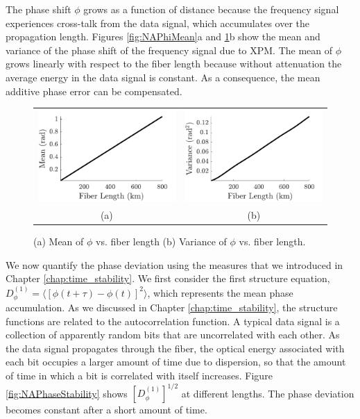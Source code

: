 The phase shift $\phi$ grows as a function of distance because the frequency signal experiences cross-talk from the data signal, which accumulates over the propagation length. Figures \ref{fig:NAPhiMean}a and \ref{fig:NAPhiVar}b show the mean and variance of the phase shift of the frequency signal due to XPM. The mean of $\phi$ grows linearly with respect to the fiber length because without attenuation the average energy in the data signal is constant. As a consequence, the mean additive phase error can be compensated.
%
\begin{figure}[htb]
	\raggedright
	\begin{tabular}{c c}
		\includegraphics[width=0.5\linewidth]{img/NAPhiMean} & \includegraphics[width=0.5\linewidth]{img/NAPhiVar} \\
		(a) & (b)
	\end{tabular}
	\renewcommand{\baselinestretch}{1}
	\small\normalsize
	\caption{(a)\label{fig:NAPhiMean} Mean of $\phi$ vs. fiber length (b)\label{fig:NAPhiVar} Variance of $\phi$ vs. fiber length.}
\end{figure}
\renewcommand{\baselinestretch}{2}
\small\normalsize

We now quantify the phase deviation using the measures that we introduced in Chapter \ref{chap:time_stability}. We first consider the first structure equation, $D^{(1)}_\phi = \langle [\phi(t+\tau) - \phi(t)]^2 \rangle$, which represents the mean phase accumulation. As we discussed in Chapter \ref{chap:time_stability}, the structure functions are related to the autocorrelation function. A typical data signal is a collection of apparently random bits that are uncorrelated with each other. As the data signal propagates through the fiber, the optical energy associated with each bit occupies a larger amount of time due to dispersion, so that the amount of time in which a bit is correlated with itself increases. Figure \ref{fig:NAPhaseStability} shows $\left[D^{(1)}_\phi\right]^{1/2}$ at different lengths. The phase deviation becomes constant after a short amount of time.

